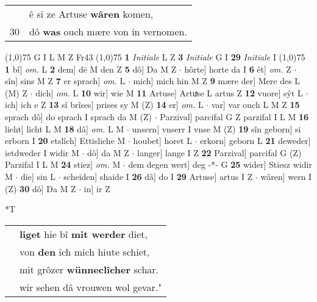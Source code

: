 \documentclass[8pt,a4paper,notitlepage]{article}
\begin{document}
\begin{table}[ht]
\begin{minipage}[t]{0.5\linewidth}
\begin{tabular}{rl}
 & ê si ze Artuse \textbf{wâren} komen,\\ 
30 & dô \textbf{was} ouch mære von in vernomen.\\ 
\end{tabular}
\scriptsize
\line(1,0){75} \newline
G I L M Z Fr43 \newline
\line(1,0){75} \newline
\textbf{1} \textit{Initiale} L Z  \textbf{3} \textit{Initiale} G I  \textbf{29} \textit{Initiale} I  \newline
\line(1,0){75} \newline
\textbf{1} bî] \textit{om.} L \textbf{2} dem] dē M den Z \textbf{5} dô] Da M Z  $\cdot$ hôrte] horte da I \textbf{6} êt] \textit{om.} Z  $\cdot$ sîn] sins M Z \textbf{7} er sprach] \textit{om.} L  $\cdot$ mich] mich hin M Z \textbf{9} mære der] Mere des L (M) Z  $\cdot$ dich] \textit{om.} L \textbf{10} wir] wie M \textbf{11} Artuse] Artuͯse L artus Z \textbf{12} vuore] sýt L  $\cdot$ ich] ich e Z \textbf{13} sî brîses] prises sy M (Z) \textbf{14} er] \textit{om.} L  $\cdot$ var] var ouch L M Z \textbf{15} sprach dô] do sprach I sprach da M (Z)  $\cdot$ Parzival] parcifal G Z parzifal I L M \textbf{16} lieht] licht L M \textbf{18} dâ] \textit{om.} L M  $\cdot$ unsern] vnserr I vnse M (Z) \textbf{19} sîn geborn] si erborn I \textbf{20} etslîch] Ettisliche M  $\cdot$ houbet] horet L  $\cdot$ erkorn] geborn L \textbf{21} deweder] ietdweder I widir M  $\cdot$ dô] da M Z  $\cdot$ langer] lange I Z \textbf{22} Parzival] parcifal G (Z) Parzifal I L M \textbf{24} stiez] \textit{om.} M  $\cdot$ dem degen wert] deg -*- G \textbf{25} wider] Stiesz widir M  $\cdot$ die] sin L  $\cdot$ scheiden] shaide I \textbf{26} dâ] do I \textbf{29} Artuse] artus I Z  $\cdot$ wâren] wern I (Z) \textbf{30} dô] Da M Z  $\cdot$ in] ir Z \newline
\end{minipage}
\hspace{0.5cm}
\begin{minipage}[t]{0.5\linewidth}
\small
\begin{center}*T
\end{center}
\begin{tabular}{rl}
 & \textbf{liget} hie bî \textbf{mit werder} diet,\\ 
 & von \textbf{den} ich mich hiute schiet,\\ 
 & mit grôzer \textbf{wünneclîcher} schar.\\ 
 & wir sehen dâ vrouwen wol gevar."\\ 

\end{tabular}
\end{minipage}
\end{table}
\end{document}
